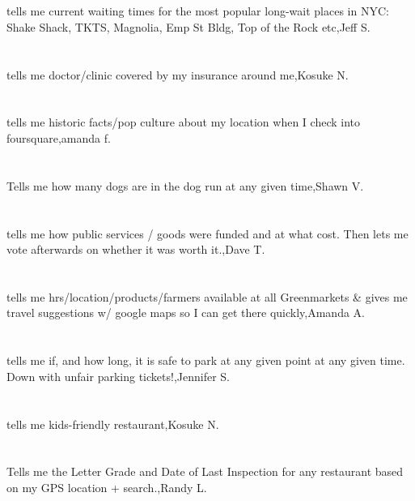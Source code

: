 \section{}tells me current waiting times for the most popular long-wait places in NYC: Shake Shack, TKTS, Magnolia,  Emp St Bldg, Top of the Rock etc,Jeff S.
\section{}tells me doctor/clinic covered by my insurance around me,Kosuke N.
\section{} tells me historic facts/pop culture about my location when I check into foursquare,amanda f.
\section{}Tells me how many dogs are in the dog run at any given time,Shawn V.	
\section{} tells me how public services / goods were funded and at what cost. Then lets me vote afterwards on whether it was worth it.,Dave T.	
\section{} tells me hrs/location/products/farmers available at all Greenmarkets \& gives me travel suggestions w/ google maps so I can get there quickly,Amanda A.	
\section{} tells me if, and how long, it is safe to park at any given point at any given time. Down with unfair parking tickets!,Jennifer S.	
\section{}tells me kids-friendly restaurant,Kosuke N.	
\section{}  Tells me the Letter Grade and Date of Last Inspection for any restaurant based on my GPS location + search.,Randy L.	
